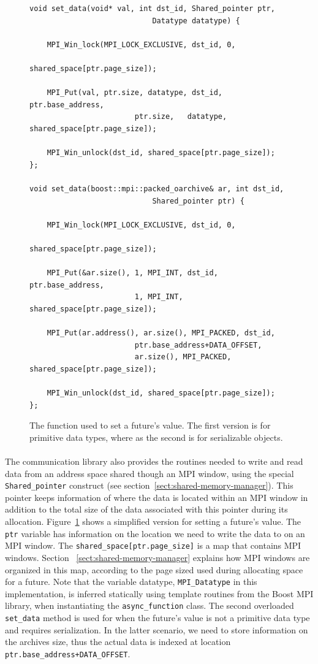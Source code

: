 \begin{figure}[!ht]
\begin{lstlisting}
void set_data(void* val, int dst_id, Shared_pointer ptr, 
							Datatype datatype) {

    MPI_Win_lock(MPI_LOCK_EXCLUSIVE, dst_id, 0, 
								shared_space[ptr.page_size]);

    MPI_Put(val, ptr.size, datatype, dst_id, ptr.base_address, 
						ptr.size,	datatype, shared_space[ptr.page_size]);

    MPI_Win_unlock(dst_id, shared_space[ptr.page_size]);
};

void set_data(boost::mpi::packed_oarchive& ar, int dst_id, 
							Shared_pointer ptr) {

    MPI_Win_lock(MPI_LOCK_EXCLUSIVE, dst_id, 0, 
								shared_space[ptr.page_size]);

    MPI_Put(&ar.size(), 1, MPI_INT, dst_id, ptr.base_address,
						1, MPI_INT, shared_space[ptr.page_size]);

    MPI_Put(ar.address(), ar.size(), MPI_PACKED, dst_id, 
						ptr.base_address+DATA_OFFSET,
						ar.size(), MPI_PACKED, shared_space[ptr.page_size]);

    MPI_Win_unlock(dst_id, shared_space[ptr.page_size]);
};
\end{lstlisting}
\caption{The function used to set a future's value.  The first version is for primitive data types, 
where as the second is for serializable objects.}
\label{lst:set_data}
\end{figure}

\paragraph{}
The communication library also provides the routines needed to write and read data from an address space shared
though an MPI window, using the special \texttt{Shared\_pointer} construct (see section~\ref{sect:shared-memory-manager}).  
This pointer keeps information of where the data is located within an MPI window in addition to the total size of the data associated with this pointer during its allocation.  Figure~\ref{lst:set_data} shows a simplified version for 
setting a future's value.  The \texttt{ptr} variable has information on the location we need to write the data to on an MPI 
window.  The \texttt{shared\_space[ptr.page\_size]} is a map that contains MPI windows.  Section
~\ref{sect:shared-memory-manager} explains how MPI windows are organized in this map, according to the 
page sized used during allocating space for a future.  Note that the variable datatype, \texttt{MPI\_Datatype} in this
implementation, is inferred statically using template routines from the Boost MPI library,
when instantiating the \texttt{async\_function} class.  The second overloaded \texttt{set\_data} method is used for
when the future's value is not a primitive data type and requires serialization.  In the latter scenario, we
need to store information on the archives size, thus the actual data is indexed at location 
\texttt{ptr.base\_address+DATA\_OFFSET}.

